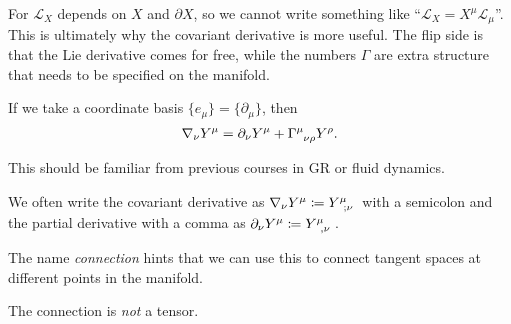 \begin{leftbar}
  \begin{remark}
    For $\mathcal{L}_X$ depends on $X$ and $\partial X$, so we cannot write something like ``$\mathcal{L}_X = X^\mu \mathcal{L}_\mu$''.
    This is ultimately why the covariant derivative is more useful. The flip side is that the Lie derivative comes for free, while the numbers $\Gamma$ are extra structure that needs to be specified on the manifold.
  \end{remark}
\end{leftbar}
If we take a coordinate basis $\{e_\mu\} = \{\partial_\mu\}$, then
\begin{equation}
  \nabla_\nu Y^\mu = \partial_\nu Y^\mu + \Gamma \indices{^\mu_\nu_\rho} Y^\rho.
\end{equation}
\begin{leftbar}
  \begin{remark}
    This should be familiar from previous courses in GR or fluid dynamics.
  \end{remark}
\end{leftbar}
\begin{notation}[]
  We often write the covariant derivative as $\nabla_\nu Y^\mu \coloneqq Y \indices{^\mu_{; \nu}}$ with a semicolon and the partial derivative with a comma as $\partial_\nu Y^\mu \coloneqq Y \indices{^\mu_{, \nu}}$.
\end{notation}
\begin{leftbar}
  \begin{remark}
    The name \emph{connection} hints that we can use this to connect tangent spaces at different points in the manifold.
  \end{remark}
\end{leftbar}
\begin{claim}
  The connection is \emph{not} a tensor.
\end{claim}
